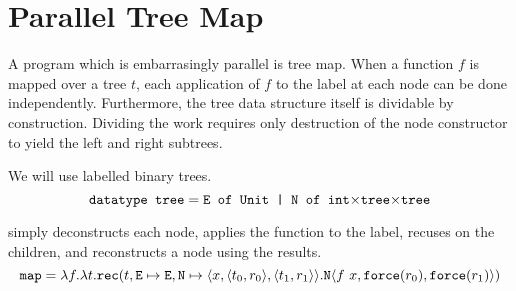 \section{Parallel Tree Map}
A program which is embarrasingly parallel is tree map.  When a function $f$ is
mapped over a tree $t$, each application of $f$ to the label at each node can
be done independently.  Furthermore, the tree data structure itself is
dividable by construction.  Dividing the work requires only destruction of the
node constructor to yield the left and right subtrees.

We will use  labelled binary trees.
%
\begin{equation*}
  \texttt{datatype tree} = \texttt{E of Unit | N of int$\times$tree$\times$tree}
\end{equation*}

%
 simply deconstructs each node, applies the function to the label,
recuses on the children, and reconstructs a node using the results.
%
\begin{equation*}
  \texttt{map} = \lambda f.\lambda t.\texttt{rec}(t, \texttt{E} \mapsto \texttt{E}, \texttt{N} \mapsto \langle x, \langle t_0, r_0 \rangle, \langle t_1, r_1 \rangle\rangle.\texttt{N} \langle f\ x, \texttt{force}(r_0), \texttt{force}(r_1)\rangle)
\end{equation*}
%
